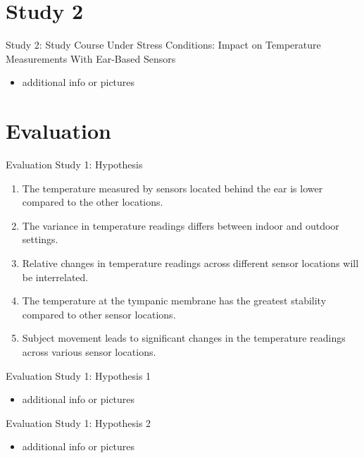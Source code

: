 \documentclass[en]{sdqbeamer}
\begin{document}
\section{Study 2}
\begin{frame}{Study 2: Study Course Under Stress Conditions: Impact on Temperature Measurements With Ear-Based Sensors}
    \begin{itemize}
        \item additional info or pictures
    \end{itemize}
\end{frame}

\section{Evaluation}
\begin{frame}{Evaluation Study 1: Hypothesis}
    \begin{enumerate}[label=H\arabic{*}:]
      \item The temperature measured by sensors located behind the ear is lower compared to the other locations.
      \item The variance in temperature readings differs between indoor and outdoor settings.
      \item Relative changes in temperature readings across different sensor locations will be interrelated.
      \item The temperature at the tympanic membrane has the greatest stability compared to other sensor locations.
      \item Subject movement leads to significant changes in the temperature readings across various sensor locations.
    \end{enumerate}
\end{frame}

\begin{frame}{Evaluation Study 1: Hypothesis 1}
    \begin{itemize}
        \item additional info or pictures
    \end{itemize}
\end{frame}

\begin{frame}{Evaluation Study 1: Hypothesis 2}
    \begin{itemize}
        \item additional info or pictures
    \end{itemize}
\end{frame}
\end{document}
